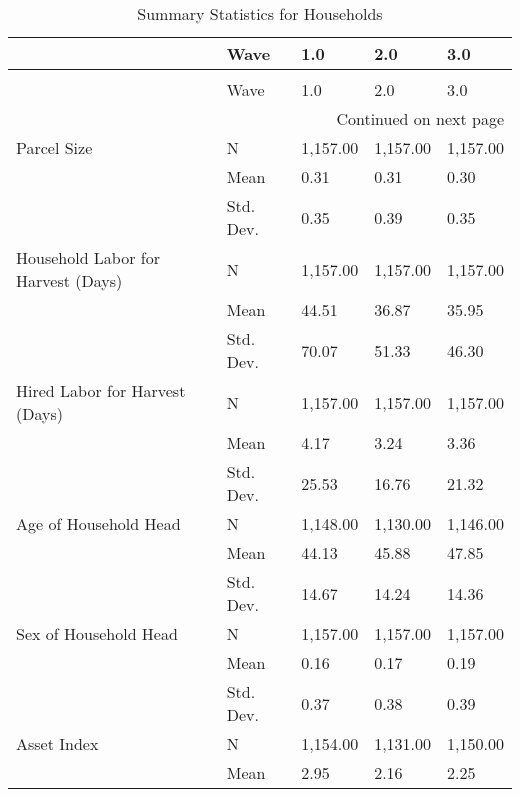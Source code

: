 \begin{longtable}{lllll}
\caption{Summary Statistics for maize growing Households}
\label{tbl:summary}\\
\toprule
                             & Wave &       1.0 &       2.0 &       3.0 \\
\midrule
\endfirsthead
\caption[]{Summary Statistics for Households} \\
\toprule
                             & Wave &       1.0 &       2.0 &       3.0 \\
\midrule
\endhead
\midrule
\multicolumn{5}{r}{{Continued on next page}} \\
\midrule
\endfoot

\bottomrule
\endlastfoot
Parcel Size & N &  1,157.00 &  1,157.00 &  1,157.00 \\
                             & Mean &      0.31 &      0.31 &      0.30 \\
                             & Std. Dev. &      0.35 &      0.39 &      0.35 \\
Household Labor for Harvest (Days) & N &  1,157.00 &  1,157.00 &  1,157.00 \\
                             & Mean &     44.51 &     36.87 &     35.95 \\
                             & Std. Dev. &     70.07 &     51.33 &     46.30 \\
Hired Labor for Harvest (Days) & N &  1,157.00 &  1,157.00 &  1,157.00 \\
                             & Mean &      4.17 &      3.24 &      3.36 \\
                             & Std. Dev. &     25.53 &     16.76 &     21.32 \\
Age of Household Head & N &  1,148.00 &  1,130.00 &  1,146.00 \\
                             & Mean &     44.13 &     45.88 &     47.85 \\
                             & Std. Dev. &     14.67 &     14.24 &     14.36 \\
Sex of Household Head & N &  1,157.00 &  1,157.00 &  1,157.00 \\
                             & Mean &      0.16 &      0.17 &      0.19 \\
                             & Std. Dev. &      0.37 &      0.38 &      0.39 \\
Asset Index & N &  1,154.00 &  1,131.00 &  1,150.00 \\
                             & Mean &      2.95 &      2.16 &      2.25 \\

\end{longtable}
